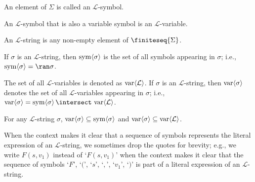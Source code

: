 \begin{dfn}
     \label{dfn:first-order-language-L-symbol}
    An element of \( \Sigma \) is called an \( \mathcal{L} \)-symbol.
\end{dfn}

\begin{dfn}
     \label{dfn:first-order-language-L-variable}
    An \( \mathcal{L} \)-symbol that is also a variable symbol is an \( \mathcal{L} \)-variable.
\end{dfn}

\begin{dfn}
     \label{dfn:first-order-language-L-string}
    An \( \mathcal{L} \)-string is any non-empty element of \( \finiteseq{\Sigma} \).
\end{dfn}

\begin{dfn}
     \label{dfn:first-order-language-set-of-all-L-symbols-in-an-L-string}
    If \( \sigma \) is an \( \mathcal{L} \)-string, then \( \operatorname{sym} \langle\sigma\rangle \) is the set of all symbols appearing in \( \sigma \);
    i.e., \( \folsymbols{\sigma} = \ran \sigma \).
\end{dfn}

\begin{dfn}
     \label{dfn:first-order-language-set-of-all-L-variables-in-an-L-string}
    The set of all \( \mathcal{L} \)-variables is denoted as \( \operatorname{var} \langle\mathcal{L}\rangle \).
    If \( \sigma \) is an \( \mathcal{L} \)-string, then \( \operatorname{var} \langle \sigma \rangle \) denotes the set of all \( \mathcal{L} \)-variables
    appearing in \( \sigma \); i.e., \( \folvars{ \sigma } = \folsymbols{ \sigma } \,{\intersect}\, \folvars{\mathcal{L}} \).
\end{dfn}

\begin{cor}
    For any \( \mathcal{L} \)-string \( \sigma \), \( \operatorname{var} \langle \sigma \rangle \subseteq \operatorname{sym} \langle \sigma \rangle \)
    and \( \operatorname{var} \langle \sigma \rangle \subseteq \operatorname{var} \langle\mathcal{L}\rangle \).
\end{cor}

\begin{notation}
    When the context makes it clear that a sequence of symbols represents the literal expression of an \( \mathcal{L} \)-string, we sometimes drop the quotes for brevity;
    e.g., we write \( F(s, v_{{1}}) \) instead of `\( F(s, v_{1}) \)' when the context makes it clear that the sequence of symbols
    `\( F \)', `\( ( \)', `\( s \)', `\( , \)', `\( v_{1} \)', `\( ) \)' is part of a literal expression of an \( \mathcal{L} \)-string.
\end{notation}

